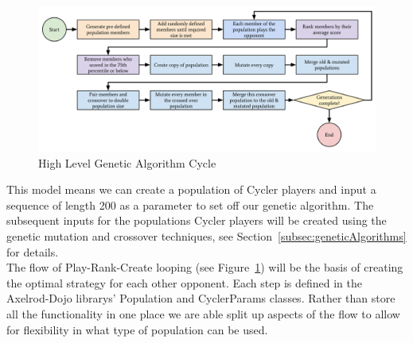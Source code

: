 \begin{figure}[ht]
    \includegraphics[width=1.0\textwidth, center]{./img/flows/custom_ga_cycle}
    \caption{High Level Genetic Algorithm Cycle}\label{fig:geneticAlgoCycle}
\end{figure}

This model means we can create a population of Cycler players and input a sequence of length 200 as a parameter to set off our genetic algorithm.
The subsequent inputs for the populations Cycler players will be created using the genetic mutation and crossover techniques, see Section~\ref{subsec:geneticAlgorithms} for details.\\

The flow of Play-Rank-Create looping (see Figure~\ref{fig:geneticAlgoCycle}) will be the basis of creating the optimal strategy for each other opponent.
Each step is defined in the Axelrod-Dojo librarys' Population and CyclerParams classes.
Rather than store all the functionality in one place we are able split up aspects of the flow to allow for flexibility in what type of population can be used.